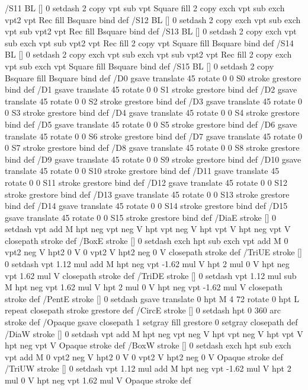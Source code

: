 /S11 {BL [] 0 setdash 2 copy vpt sub vpt Square fill 2 copy exch vpt sub exch vpt2 vpt Rec fill
	Bsquare} bind def
/S12 {BL [] 0 setdash 2 copy exch vpt sub exch vpt sub vpt2 vpt Rec fill Bsquare} bind def
/S13 {BL [] 0 setdash 2 copy exch vpt sub exch vpt sub vpt2 vpt Rec fill
	2 copy vpt Square fill Bsquare} bind def
/S14 {BL [] 0 setdash 2 copy exch vpt sub exch vpt sub vpt2 vpt Rec fill
	2 copy exch vpt sub exch vpt Square fill Bsquare} bind def
/S15 {BL [] 0 setdash 2 copy Bsquare fill Bsquare} bind def
/D0 {gsave translate 45 rotate 0 0 S0 stroke grestore} bind def
/D1 {gsave translate 45 rotate 0 0 S1 stroke grestore} bind def
/D2 {gsave translate 45 rotate 0 0 S2 stroke grestore} bind def
/D3 {gsave translate 45 rotate 0 0 S3 stroke grestore} bind def
/D4 {gsave translate 45 rotate 0 0 S4 stroke grestore} bind def
/D5 {gsave translate 45 rotate 0 0 S5 stroke grestore} bind def
/D6 {gsave translate 45 rotate 0 0 S6 stroke grestore} bind def
/D7 {gsave translate 45 rotate 0 0 S7 stroke grestore} bind def
/D8 {gsave translate 45 rotate 0 0 S8 stroke grestore} bind def
/D9 {gsave translate 45 rotate 0 0 S9 stroke grestore} bind def
/D10 {gsave translate 45 rotate 0 0 S10 stroke grestore} bind def
/D11 {gsave translate 45 rotate 0 0 S11 stroke grestore} bind def
/D12 {gsave translate 45 rotate 0 0 S12 stroke grestore} bind def
/D13 {gsave translate 45 rotate 0 0 S13 stroke grestore} bind def
/D14 {gsave translate 45 rotate 0 0 S14 stroke grestore} bind def
/D15 {gsave translate 45 rotate 0 0 S15 stroke grestore} bind def
/DiaE {stroke [] 0 setdash vpt add M
  hpt neg vpt neg V hpt vpt neg V
  hpt vpt V hpt neg vpt V closepath stroke} def
/BoxE {stroke [] 0 setdash exch hpt sub exch vpt add M
  0 vpt2 neg V hpt2 0 V 0 vpt2 V
  hpt2 neg 0 V closepath stroke} def
/TriUE {stroke [] 0 setdash vpt 1.12 mul add M
  hpt neg vpt -1.62 mul V
  hpt 2 mul 0 V
  hpt neg vpt 1.62 mul V closepath stroke} def
/TriDE {stroke [] 0 setdash vpt 1.12 mul sub M
  hpt neg vpt 1.62 mul V
  hpt 2 mul 0 V
  hpt neg vpt -1.62 mul V closepath stroke} def
/PentE {stroke [] 0 setdash gsave
  translate 0 hpt M 4 {72 rotate 0 hpt L} repeat
  closepath stroke grestore} def
/CircE {stroke [] 0 setdash 
  hpt 0 360 arc stroke} def
/Opaque {gsave closepath 1 setgray fill grestore 0 setgray closepath} def
/DiaW {stroke [] 0 setdash vpt add M
  hpt neg vpt neg V hpt vpt neg V
  hpt vpt V hpt neg vpt V Opaque stroke} def
/BoxW {stroke [] 0 setdash exch hpt sub exch vpt add M
  0 vpt2 neg V hpt2 0 V 0 vpt2 V
  hpt2 neg 0 V Opaque stroke} def
/TriUW {stroke [] 0 setdash vpt 1.12 mul add M
  hpt neg vpt -1.62 mul V
  hpt 2 mul 0 V
  hpt neg vpt 1.62 mul V Opaque stroke} def
